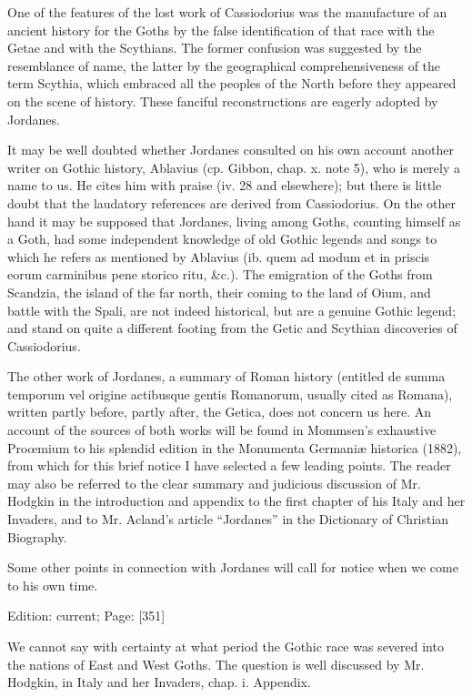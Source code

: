 One of the features of the lost work of Cassiodorius was the manufacture of an ancient history for the Goths by the false identification of that race with the Getae and with the Scythians. The former confusion was suggested by the resemblance of name, the latter by the geographical comprehensiveness of the term Scythia, which embraced all the peoples of the North before they appeared on the scene of history. These fanciful reconstructions are eagerly adopted by Jordanes.

It may be well doubted whether Jordanes consulted on his own account another writer on Gothic history, Ablavius (cp. Gibbon, chap. x. note 5), who is merely a name to us. He cites him with praise (iv. 28 and elsewhere); but there is little doubt that the laudatory references are derived from Cassiodorius. On the other hand it may be supposed that Jordanes, living among Goths, counting himself as a Goth, had some independent knowledge of old Gothic legends and songs to which he refers as mentioned by Ablavius (ib. quem ad modum et in priscis eorum carminibus pene storico ritu, \&c.). The emigration of the Goths from Scandzia, the island of the far north, their coming to the land of Oium, and battle with the Spali, are not indeed historical, but are a genuine Gothic legend; and stand on quite a different footing from the Getic and Scythian discoveries of Cassiodorius.

The other work of Jordanes, a summary of Roman history (entitled de summa temporum vel origine actibusque gentis Romanorum, usually cited as Romana), written partly before, partly after, the Getica, does not concern us here. An account of the sources of both works will be found in Mommsen\texthebrew{}’s exhaustive Proœmium to his splendid edition in the Monumenta Germaniæ historica (1882), from which for this brief notice I have selected a few leading points. The reader may also be referred to the clear summary and judicious discussion of Mr. Hodgkin in the introduction and appendix to the first chapter of his Italy and her Invaders, and to Mr. Acland\texthebrew{}’s article \texthebrew{“}Jordanes\texthebrew{}” in the Dictionary of Christian Biography.

Some other points in connection with Jordanes will call for notice when we come to his own time.

Edition: current; Page: [351]


We cannot say with certainty at what period the Gothic race was severed into the nations of East and West Goths. The question is well discussed by Mr. Hodgkin, in Italy and her Invaders, chap. i. Appendix.

